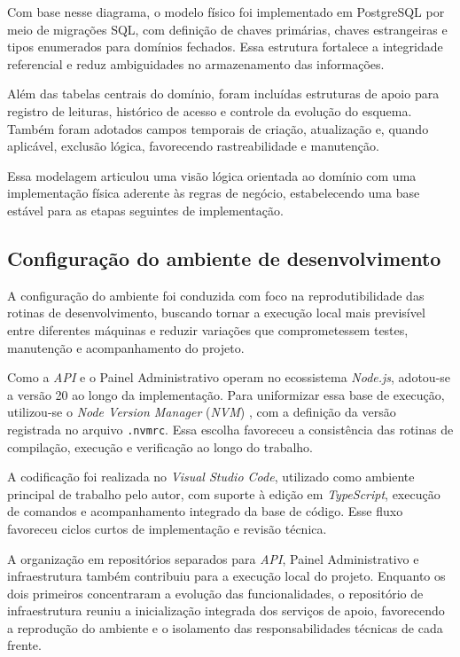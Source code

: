 Com base nesse diagrama, o modelo físico foi implementado em PostgreSQL por meio de migrações SQL, com definição de chaves primárias, chaves estrangeiras e tipos enumerados para domínios fechados. Essa estrutura fortalece a integridade referencial e reduz ambiguidades no armazenamento das informações.

Além das tabelas centrais do domínio, foram incluídas estruturas de apoio para registro de leituras, histórico de acesso e controle da evolução do esquema. Também foram adotados campos temporais de criação, atualização e, quando aplicável, exclusão lógica, favorecendo rastreabilidade e manutenção.

Essa modelagem articulou uma visão lógica orientada ao domínio com uma implementação física aderente às regras de negócio, estabelecendo uma base estável para as etapas seguintes de implementação.

\subsection{Configuração do ambiente de desenvolvimento}

A configuração do ambiente foi conduzida com foco na reprodutibilidade das rotinas de desenvolvimento, buscando tornar a execução local mais previsível entre diferentes máquinas e reduzir variações que comprometessem testes, manutenção e acompanhamento do projeto.

Como a \emph{API} e o Painel Administrativo operam no ecossistema \emph{Node.js}, adotou-se a versão 20 ao longo da implementação. Para uniformizar essa base de execução, utilizou-se o \emph{Node Version Manager} (\emph{NVM}) \cite{nvmdocs}, com a definição da versão registrada no arquivo \texttt{.nvmrc}. Essa escolha favoreceu a consistência das rotinas de compilação, execução e verificação ao longo do trabalho.

A codificação foi realizada no \emph{Visual Studio Code}, utilizado como ambiente principal de trabalho pelo autor, com suporte à edição em \emph{TypeScript}, execução de comandos e acompanhamento integrado da base de código. Esse fluxo favoreceu ciclos curtos de implementação e revisão técnica.

A organização em repositórios separados para \emph{API}, Painel Administrativo e infraestrutura também contribuiu para a execução local do projeto. Enquanto os dois primeiros concentraram a evolução das funcionalidades, o repositório de infraestrutura reuniu a inicialização integrada dos serviços de apoio, favorecendo a reprodução do ambiente e o isolamento das responsabilidades técnicas de cada frente.

